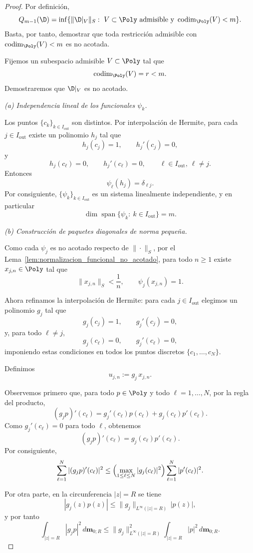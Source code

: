 \begin{proof}
	Por definición,
	\[
		Q_{m-1}(\D)
		=
		\inf\{\|\D|_V\|_S:\ V\subset\Poly\ \text{admisible y}\ \operatorname{codim}_{\Poly}(V)<m\}.
	\]
	Basta, por tanto, demostrar que toda restricción admisible con
	$\operatorname{codim}_{\Poly}(V)<m$ es no acotada.

	Fijemos un subespacio admisible $V\subset \Poly$ tal que
	\[
		\operatorname{codim}_{\Poly}(V)=r<m.
	\]
	Demostraremos que $\D|_V$ es no acotado.

	\smallskip
	\noindent
	\emph{(a) Independencia lineal de los funcionales $\psi_k$.}

	Los puntos $\{c_k\}_{k\in I_{\mathrm{out}}}$ son distintos. Por interpolación de Hermite,
	para cada $j\in I_{\mathrm{out}}$ existe un polinomio $h_j$ tal que
	\[
		h_j(c_j)=1,\qquad h_j'(c_j)=0,
	\]
	y
	\[
		h_j(c_\ell)=0,\qquad h_j'(c_\ell)=0,
		\qquad \ell\in I_{\mathrm{out}},\ \ell\neq j.
	\]
	Entonces
	\[
		\psi_\ell(h_j)=\delta_{\ell j}.
	\]
	Por consiguiente, $\{\psi_k\}_{k\in I_{\mathrm{out}}}$ es un sistema linealmente independiente,
	y en particular
	\[
		\dim \operatorname{span}\{\psi_k:\ k\in I_{\mathrm{out}}\}=m.
	\]

	\smallskip
	\noindent
	\emph{(b) Construcción de paquetes diagonales de norma pequeña.}

	Como cada $\psi_j$ es no acotado respecto de $\|\cdot\|_S$, por el
	Lema~\ref{lem:normalizacion_funcional_no_acotado}, para todo $n\ge1$
	existe $x_{j,n}\in \Poly$ tal que
	\[
		\|x_{j,n}\|_S<\frac1n,
		\qquad
		\psi_j(x_{j,n})=1.
	\]

	Ahora refinamos la interpolación de Hermite: para cada $j\in I_{\mathrm{out}}$ elegimos
	un polinomio $g_j$ tal que
	\[
		g_j(c_j)=1,\qquad g_j'(c_j)=0,
	\]
	y, para todo $\ell\neq j$,
	\[
		g_j(c_\ell)=0,\qquad g_j'(c_\ell)=0,
	\]
	imponiendo estas condiciones en todos los puntos discretos
	$\{c_1,\dots,c_N\}$.

	Definimos
	\[
		u_{j,n}:=g_j\,x_{j,n}.
	\]

	Observemos primero que, para todo $p\in\Poly$ y todo $\ell=1,\dots,N$,
	por la regla del producto,
	\[
		(g_jp)'(c_\ell)
		=
		g_j'(c_\ell)p(c_\ell)+g_j(c_\ell)p'(c_\ell).
	\]
	Como $g_j'(c_\ell)=0$ para todo $\ell$, obtenemos
	\[
		(g_jp)'(c_\ell)=g_j(c_\ell)p'(c_\ell).
	\]
	Por consiguiente,
	\[
		\sum_{\ell=1}^N |(g_jp)'(c_\ell)|^2
		\le
		\Bigl(\max_{1\le \ell\le N}|g_j(c_\ell)|^2\Bigr)
		\sum_{\ell=1}^N |p'(c_\ell)|^2.
	\]

	Por otra parte, en la circunferencia $|z|=R$ se tiene
	\[
		|g_j(z)p(z)|
		\le
		\|g_j\|_{L^\infty(|z|=R)}\,|p(z)|,
	\]
	y por tanto
	\[
		\int_{|z|=R}|g_jp|^2\,d\mathbf{m}_{0;R}
		\le
		\|g_j\|_{L^\infty(|z|=R)}^2
		\int_{|z|=R}|p|^2\,d\mathbf{m}_{0;R}.
	\]


\end{proof}
